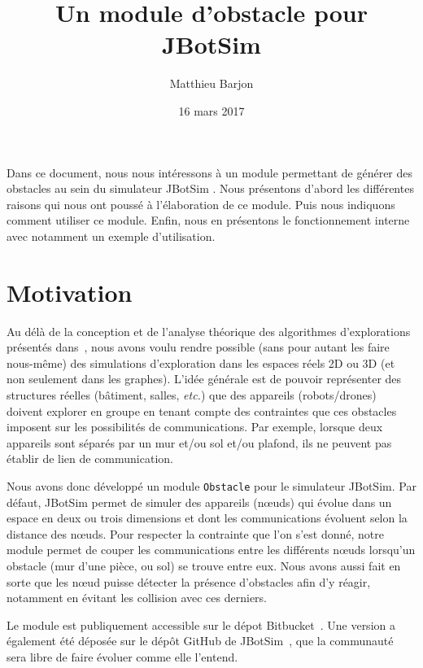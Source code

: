 \documentclass{article}
\title{Un module d'obstacle pour JBotSim}
\author{Matthieu Barjon}
\date{16 mars 2017}
\newcommand{\obstacle}{{\tt Obstacle}\xspace}
\begin{document}
\maketitle

\label{obstacle}

Dans ce document, nous nous intéressons à un module permettant de générer des obstacles au sein du simulateur JBotSim \cite{jbotsim}.
Nous présentons d'abord les différentes raisons qui nous ont poussé à l'élaboration de ce module.
Puis nous indiquons comment utiliser ce module.
Enfin, nous en présentons le fonctionnement interne avec notamment un exemple d'utilisation.

\section{Motivation}
\label{obstacle:section:motivation}

Au délà de la conception et de l'analyse théorique des algorithmes d'explorations présentés dans~\cite{these}, nous avons voulu rendre possible (sans pour autant les faire nous-même) des simulations d'exploration dans les espaces réels 2D ou 3D (et non seulement dans les graphes). 
L'idée générale est de pouvoir représenter des structures réelles (bâtiment, salles, {\it etc.}) que des appareils (robots/drones) doivent explorer en groupe en tenant compte des contraintes que ces obstacles imposent sur les possibilités de communications.
Par exemple, lorsque deux appareils sont séparés par un mur et/ou sol et/ou plafond, ils ne peuvent pas établir de lien de communication.\medskip

Nous avons donc développé un module \obstacle pour le simulateur JBotSim. Par défaut, JBotSim permet de simuler des appareils (nœuds) qui évolue dans un espace en deux ou trois dimensions et dont les communications évoluent selon la distance des nœuds. Pour respecter la contrainte que l'on s'est donné, notre module permet de couper les communications entre les différents nœuds lorsqu'un obstacle (mur d'une pièce, ou sol) se trouve entre eux. Nous avons aussi fait en sorte que les n\oe ud puisse détecter la présence d'obstacles afin d'y réagir, notamment en évitant les collision avec ces derniers.\medskip

Le module est publiquement accessible sur le dépot Bitbucket~\cite{obstacle}. Une version a également été déposée sur le dépôt GitHub de JBotSim~\cite{github}, que la communauté sera libre de faire évoluer comme elle l'entend.
\end{document}
